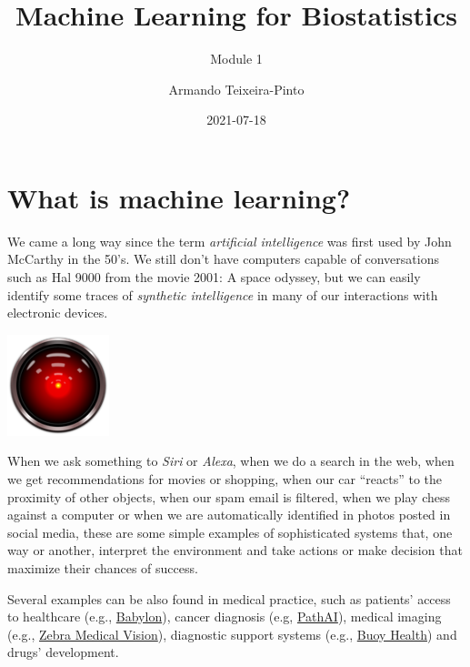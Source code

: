 \documentclass[
]{book}
\title{Machine Learning for Biostatistics}
\subtitle{Module 1}
\author{Armando Teixeira-Pinto}
\date{2021-07-18}
\begin{document}
\maketitle

{
\setcounter{tocdepth}{1}
\tableofcontents
}
\hypertarget{what-is-machine-learning}{%
\chapter*{What is machine learning?}\label{what-is-machine-learning}}

We came a long way since the term \emph{artificial intelligence} was first used by
John McCarthy in the 50's. We still don't have computers capable of conversations
such as Hal 9000 from the movie 2001: A space odyssey, but we can easily
identify some traces of \emph{synthetic intelligence} in many of our interactions
with electronic devices.

\begin{center}\includegraphics[width=0.2\linewidth]{hal} \end{center}

When we ask something to \emph{Siri} or \emph{Alexa}, when we do a
search in the web, when we get recommendations for
movies or shopping, when our car ``reacts'' to the proximity of other objects,
when our spam email is filtered,
when we play chess against a computer or when we are automatically
identified in photos posted in social media, these are some simple examples of
sophisticated systems that, one way or another, interpret the environment and
take actions or make decision that maximize their chances of success.

Several examples can be also found in medical practice, such as patients'
access to healthcare (e.g., \href{https://search.proquest.com/openview/bf25c0b78beeffec5b3419ea7ffc79f9/1?pq-origsite=gscholar\&cbl=2042228}{Babylon}), cancer diagnosis (e.g, \href{https://jamanetwork.com/journals/jama/article-abstract/2665774}{PathAI}),
medical imaging (e.g., \href{https://www.hbs.edu/faculty/Pages/item.aspx?num=55060}{Zebra Medical Vision}), diagnostic
support systems
(e.g., \href{https://www.bizjournals.com/boston/news/2018/08/22/boston-childrens-website-to-feature-self.html}{Buoy Health}) and drugs' development.
\end{document}
